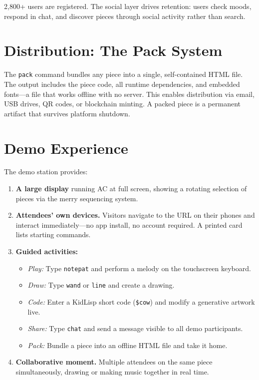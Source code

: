 \documentclass[manuscript,anonymous,review]{acmart}
\begin{document}
2,800+ users are registered. The social layer drives retention: users check moods, respond in chat, and discover pieces through social activity rather than search.

\section{Distribution: The Pack System}

The \texttt{pack} command bundles any piece into a single, self-contained HTML file. The output includes the piece code, all runtime dependencies, and embedded fonts---a file that works offline with no server. This enables distribution via email, USB drives, QR codes, or blockchain minting. A packed piece is a permanent artifact that survives platform shutdown.

\section{Demo Experience}

The demo station provides:

\begin{enumerate}
  \item \textbf{A large display} running AC at full screen, showing a rotating selection of pieces via the merry sequencing system.
  \item \textbf{Attendees' own devices.} Visitors navigate to the URL on their phones and interact immediately---no app install, no account required. A printed card lists starting commands.
  \item \textbf{Guided activities:}
    \begin{itemize}
      \item \emph{Play:} Type \texttt{notepat} and perform a melody on the touchscreen keyboard.
      \item \emph{Draw:} Type \texttt{wand} or \texttt{line} and create a drawing.
      \item \emph{Code:} Enter a KidLisp short code (\texttt{\$cow}) and modify a generative artwork live.
      \item \emph{Share:} Type \texttt{chat} and send a message visible to all demo participants.
      \item \emph{Pack:} Bundle a piece into an offline HTML file and take it home.
    \end{itemize}
  \item \textbf{Collaborative moment.} Multiple attendees on the same piece simultaneously, drawing or making music together in real time.
\end{enumerate}
\end{document}
